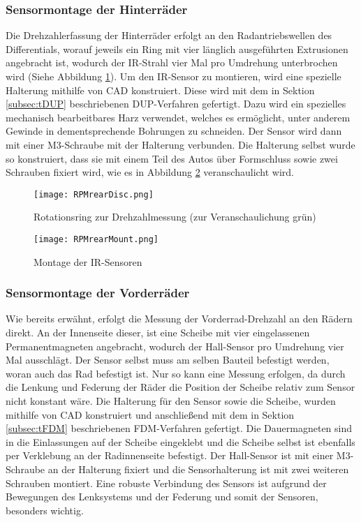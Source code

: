 \subsubsection{Sensormontage der Hinterräder}
\label{subsubsec:RPMmountRear}
Die Drehzahlerfassung der Hinterräder erfolgt an den Radantriebswellen des Differentials, worauf jeweils ein Ring mit vier länglich ausgeführten Extrusionen angebracht ist, wodurch der \ac{IR}-Strahl vier Mal pro Umdrehung unterbrochen wird (Siehe Abbildung \ref{fig:RPMrearDisc}). Um den \ac{IR}-Sensor zu montieren, wird eine spezielle Halterung mithilfe von \ac{CAD} konstruiert. Diese wird mit dem in Sektion \ref{subsec:tDUP} beschriebenen \ac{DUP}-Verfahren gefertigt. Dazu wird ein spezielles mechanisch bearbeitbares Harz verwendet, welches es ermöglicht, unter anderem Gewinde in dementsprechende Bohrungen zu schneiden. Der Sensor wird dann mit einer M3-Schraube mit der Halterung verbunden. Die Halterung selbst wurde so konstruiert, dass sie mit einem Teil des Autos über Formschluss sowie zwei Schrauben fixiert wird, wie es in Abbildung \ref{fig:RPMrearMount} veranschaulicht wird.
\begin{figure}[h]
\centering
\texttt{[image: RPMrearDisc.png]}
\caption{Rotationsring zur Drehzahlmessung (zur Veranschaulichung grün)}
\label{fig:RPMrearDisc}
\end{figure}

\begin{figure}[h]
\centering
\texttt{[image: RPMrearMount.png]}
\caption{Montage der \ac{IR}-Sensoren}
\label{fig:RPMrearMount}
\end{figure}

\subsubsection{Sensormontage der Vorderräder}
\label{subsubsec:RPMmountFront}
Wie bereits erwähnt, erfolgt die Messung der Vorderrad-Drehzahl an den Rädern direkt. An der Innenseite dieser, ist eine Scheibe mit vier eingelassenen Permanentmagneten angebracht, wodurch der Hall-Sensor pro Umdrehung vier Mal ausschlägt. Der Sensor selbst muss am selben Bauteil befestigt werden, woran auch das Rad befestigt ist. Nur so kann eine Messung erfolgen, da durch die Lenkung und Federung der Räder die Position der Scheibe relativ zum Sensor nicht konstant wäre. Die Halterung für den Sensor sowie die Scheibe, wurden mithilfe von \ac{CAD} konstruiert und anschließend mit dem in Sektion \ref{subsec:tFDM} beschriebenen \ac{FDM}-Verfahren gefertigt. Die Dauermagneten sind in die Einlassungen auf der Scheibe eingeklebt und die Scheibe selbst ist ebenfalls per Verklebung an der Radinnenseite befestigt. Der Hall-Sensor ist mit einer M3-Schraube an der Halterung fixiert und die Sensorhalterung ist mit zwei weiteren Schrauben montiert. Eine robuste Verbindung des Sensors ist aufgrund der Bewegungen des Lenksystems und der Federung und somit der Sensoren, besonders wichtig.


